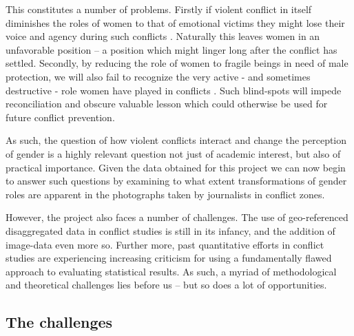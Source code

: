 \documentclass[a4paper]{article}
\begin{document}
This constitutes a number of problems. Firstly if violent conflict in itself diminishes the roles of women to that of emotional victims they might lose their voice and agency during such conflicts \citep{hansen2000gender, hansen2000little}. Naturally this leaves women in an unfavorable position \citep[294-297]{hansen2000little} -- a position which might linger long after the conflict has settled. Secondly, by reducing the role of women to fragile beings in need of male protection, we will also fail to recognize the very active - and sometimes destructive - role women have played in conflicts \citep[66]{hansen2000gender}. Such blind-spots will impede reconciliation and obscure valuable lesson which could otherwise be used for future conflict prevention.\par

As such, the question of how violent conflicts interact and change the perception of gender is a highly relevant question not just of academic interest, but also of practical importance. Given the data obtained for this project we can now begin to answer such questions by examining to what extent transformations of gender roles are apparent in the photographs taken by journalists in conflict zones.\par

However, the project also faces a number of challenges. The use of geo-referenced disaggregated data in conflict studies is still in its infancy, and the addition of image-data even more so. Further more, past quantitative efforts in conflict studies are experiencing increasing criticism for using a fundamentally flawed approach to evaluating statistical results. As such, a myriad of methodological and theoretical challenges lies before us -- but so does a lot of opportunities.\par


\subsection{The challenges}
\end{document}
